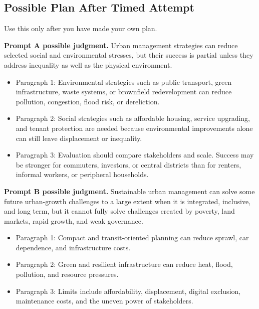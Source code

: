 \documentclass[11pt,a4paper]{article}
\begin{document}
\subsection{Possible Plan After Timed Attempt}

Use this only after you have made your own plan.

\noindent\colorbox{SoftTint}{%
\begin{minipage}{0.965\textwidth}
\sffamily
\textbf{\textcolor{HeadingBlue}{Prompt A possible judgment.}}
Urban management strategies can reduce selected social and environmental
stresses, but their success is partial unless they address inequality as well
as the physical environment.
\end{minipage}
}

\begin{itemize}
  \item Paragraph 1: Environmental strategies such as public transport, green
  infrastructure, waste systems, or brownfield redevelopment can reduce
  pollution, congestion, flood risk, or dereliction.
  \item Paragraph 2: Social strategies such as affordable housing, service
  upgrading, and tenant protection are needed because environmental
  improvements alone can still leave displacement or inequality.
  \item Paragraph 3: Evaluation should compare stakeholders and scale. Success
  may be stronger for commuters, investors, or central districts than for
  renters, informal workers, or peripheral households.
\end{itemize}

\noindent\colorbox{SoftBlue}{%
\begin{minipage}{0.965\textwidth}
\sffamily
\textbf{\textcolor{HeadingBlue}{Prompt B possible judgment.}}
Sustainable urban management can solve some future urban-growth challenges to a
large extent when it is integrated, inclusive, and long term, but it cannot
fully solve challenges created by poverty, land markets, rapid growth, and weak
governance.
\end{minipage}
}

\begin{itemize}
  \item Paragraph 1: Compact and transit-oriented planning can reduce sprawl,
  car dependence, and infrastructure costs.
  \item Paragraph 2: Green and resilient infrastructure can reduce heat, flood,
  pollution, and resource pressures.
  \item Paragraph 3: Limits include affordability, displacement, digital
  exclusion, maintenance costs, and the uneven power of stakeholders.
\end{itemize}
\end{document}
